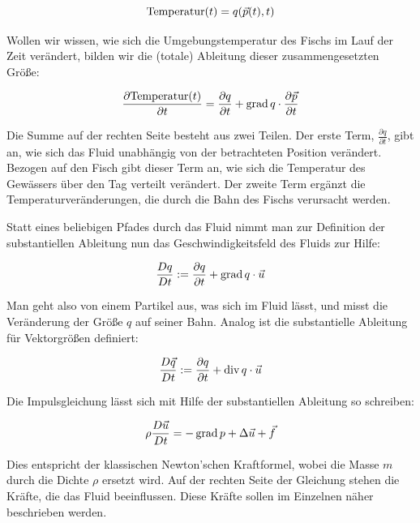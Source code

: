 \begin{equation}
\textnormal{Temperatur}(t) = q(\vec{p}(t),t)
\end{equation}

Wollen wir wissen, wie sich die Umgebungstemperatur des Fischs im Lauf der Zeit
verändert, bilden wir die (totale) Ableitung dieser zusammengesetzten Größe:

\begin{equation}
\frac{
	\partial \textnormal{Temperatur}(t)
}
{
	\partial t
}
=
\frac{
	\partial q
}
{
	\partial t
}
+
\operatorname*{grad} q \cdot
\frac{
	\partial \vec{p}}
{
	\partial t
}
\end{equation}

Die Summe auf der rechten Seite besteht aus zwei Teilen. Der erste Term,
    $\frac{\partial q}{\partial t}$, gibt an, wie sich das Fluid unabhängig von
    der betrachteten Position verändert. Bezogen auf den Fisch gibt dieser Term
    an, wie sich die Temperatur des Gewässers über den Tag verteilt verändert.
    Der zweite Term ergänzt die Temperaturveränderungen, die durch die Bahn des
    Fischs verursacht werden.

Statt eines beliebigen Pfades durch das Fluid nimmt man zur Definition der
substantiellen Ableitung nun das Geschwindigkeitsfeld des Fluids zur Hilfe:

\begin{equation}
\frac{
	Dq}
{
	Dt
} :=
\frac{
	\partial q
}
{
	\partial t
}
+
\operatorname*{grad} q \cdot
\vec{u}
\end{equation}

Man geht also von einem Partikel aus, was sich im Fluid 
lässt, und misst die Veränderung der Größe $q$ auf seiner Bahn. Analog ist die
substantielle Ableitung für Vektorgrößen definiert:

\begin{equation}
\frac{
	D\vec{q}}
{
	Dt
} :=
\frac{
	\partial q
}
{
	\partial t
}
+
\operatorname*{div} q \cdot
\vec{u}
\end{equation}

Die Impulsgleichung lässt sich mit Hilfe der substantiellen Ableitung so schreiben:

\begin{equation}
\rho \frac{D\vec{u}}{Dt} = - \operatorname*{grad} p + \Delta \vec{u} + \vec{f}
\end{equation}

Dies entspricht der klassischen Newton'schen Kraftformel, wobei die Masse $m$
durch die Dichte $\rho$ ersetzt wird. Auf der rechten Seite der Gleichung stehen die Kräfte, die das
Fluid beeinflussen. Diese Kräfte sollen im Einzelnen näher beschrieben
werden.

